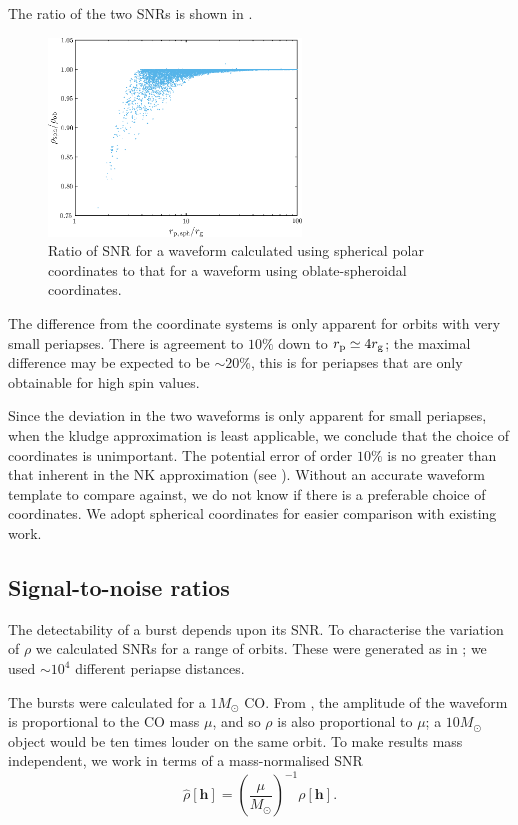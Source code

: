 The ratio of the two SNRs is shown in .
\begin{figure}%
\centering
 \includegraphics[width=0.6\textwidth]{./images/Fig_SNR_ratio}
 \caption{Ratio of SNR for a waveform calculated using spherical polar coordinates to that for a waveform using oblate-spheroidal coordinates.}
   \label{fig:Oblate_sphere}
\end{figure}
The difference from the coordinate systems is only apparent for orbits with very small periapses. There is agreement to $10\%$ down to $r_\mathrm{p} \simeq 4 r_\mathrm{g}$; the maximal difference may be expected to be $\sim 20\%$, this is for periapses that are only obtainable for high spin values.

Since the deviation in the two waveforms is only apparent for small periapses, when the kludge approximation is least applicable, we conclude that the choice of coordinates is unimportant. The potential error of order $10\%$ is no greater than that inherent in the NK approximation (see ). Without an accurate waveform template to compare against, we do not know if there is a preferable choice of coordinates. We adopt spherical coordinates for easier comparison with existing work.

\subsection{Signal-to-noise ratios}\label{sec:Gal-SNR}

The detectability of a burst depends upon its SNR. To characterise the variation of $\rho$ we calculated SNRs for a range of orbits. These were generated as in ; we used $\sim 10^4$ different periapse distances.

The bursts were calculated for a $1 M_\odot$ CO. From , the amplitude of the waveform is proportional to the CO mass $\mu$, and so $\rho$ is also proportional to $\mu$; a $10 M_\odot$ object would be ten times louder on the same orbit. To make results mass independent, we work in terms of a mass-normalised SNR
\begin{equation}
\hat{\rho}[\boldsymbol{h}] = \left(\dfrac{\mu}{M_\odot}\right)^{-1}\rho[\boldsymbol{h}].
\end{equation}

